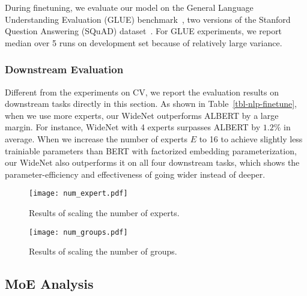 \documentclass[letterpaper]{article} \usepackage{aaai22}  \usepackage{times}  \usepackage{helvet}  \usepackage{courier}  \usepackage[hyphens]{url}  \usepackage{graphicx} \urlstyle{rm} \def\UrlFont{\rm}  \usepackage{natbib}  \usepackage{caption} \DeclareCaptionStyle{ruled}{labelfont=normalfont,labelsep=colon,strut=off} \frenchspacing  \setlength{\pdfpagewidth}{8.5in}  \setlength{\pdfpageheight}{11in}  \usepackage{algorithm}
\begin{document}
During finetuning, we evaluate our model on the General Language Understanding Evaluation (GLUE) benchmark~\citep{wang-etal-2018-glue}, two versions of the Stanford Question Answering (SQuAD) dataset~\citep{rajpurkar-etal-2016-squad,rajpurkar-etal-2018-know}. For GLUE experiments, we report median over 5 runs on development set because of relatively large variance.

\subsubsection{Downstream Evaluation}
\label{sec:nlp-downsteam}







Different from the experiments on CV, we report the evaluation results on downstream tasks directly in this section. As shown in Table~\ref{tbl-nlp-finetune}, when we use more experts, our WideNet outperforms ALBERT by a large margin. For instance, WideNet with 4 experts surpasses ALBERT by $1.2\%$ in average. When we increase the number of experts $E$ to 16 to achieve slightly less trainiable parameters than BERT with factorized embedding  parameterization, our WideNet also outperforms it on all four downstream tasks, which shows the parameter-efficiency and effectiveness of going wider instead of deeper.







\begin{figure*}
\centering
\begin{minipage}[b]{.45\textwidth}
\texttt{[image: num\_expert.pdf]}
\caption{Results of scaling the number of experts.}\label{fig:num_expert}
\end{minipage}\hfill
\begin{minipage}[b]{.45\textwidth}
\texttt{[image: num\_groups.pdf]}
\caption{Results of scaling the number of groups.}\label{fig:num_group}
\end{minipage}
\end{figure*}




\subsection{MoE Analysis} 
\end{document}
